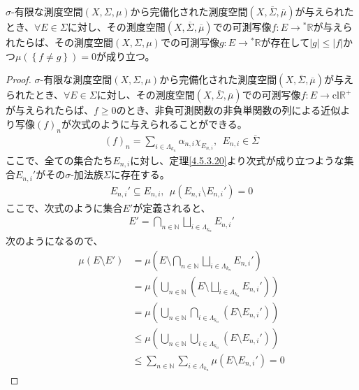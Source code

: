 \documentclass[dvipdfmx]{jsarticle}
\begin{document}
\begin{thm}\label{4.5.5.22}
$\sigma$-有限な測度空間$(X,\varSigma,\mu)$から完備化された測度空間$\left( X,\overline{\varSigma},\overline{\mu} \right)$が与えられたとき、$\forall E \in \varSigma$に対し、その測度空間$\left( X,\overline{\varSigma},\overline{\mu} \right)$での可測写像$f:E \rightarrow{}^{*}\mathbb{R}$が与えられたらば、その測度空間$(X,\varSigma,\mu)$での可測写像$g:E \rightarrow{}^{*}\mathbb{R}$が存在して$|g| \leq |f|$かつ$\mu\left( \left\{ f \neq g \right\} \right) = 0$が成り立つ。
\end{thm}
\begin{proof}
$\sigma$-有限な測度空間$(X,\varSigma,\mu)$から完備化された測度空間$\left( X,\overline{\varSigma},\overline{\mu} \right)$が与えられたとき、$\forall E \in \varSigma$に対し、その測度空間$\left( X,\overline{\varSigma},\overline{\mu} \right)$での可測写像$f:E \rightarrow \mathrm{cl}\mathbb{R}^{+}$が与えられたらば、$f \geq 0$のとき、非負可測関数の非負単関数の列による近似より写像$(f)_{n}$が次式のように与えられることができる。
\begin{align*}
(f)_{n} = \sum_{i \in \varLambda_{k_{n}}} {\alpha_{n,i}\chi_{E_{n,i}}},\ \ E_{n,i} \in \overline{\varSigma}
\end{align*}
ここで、全ての集合たち$E_{n,i}$に対し、定理\ref{4.5.3.20}より次式が成り立つような集合$E_{n,i}'$がその$\sigma$-加法族$\varSigma$に存在する。
\begin{align*}
E_{n,i}' \subseteq E_{n,i},\ \ \mu\left( E_{n,i} \setminus E_{n,i}' \right) = 0
\end{align*}
ここで、次式のように集合$E'$が定義されると、
\begin{align*}
E' = \bigcap_{n \in \mathbb{N}} {\bigsqcup_{i \in \varLambda_{k_{n}}} E_{n,i}'}
\end{align*}
次のようになるので、
\begin{align*}
\mu\left( E \setminus E' \right) &= \mu\left( E \setminus \bigcap_{n \in \mathbb{N}} {\bigsqcup_{i \in \varLambda_{k_{n}}} E_{n,i}'} \right)\\
&= \mu\left( \bigcup_{n \in \mathbb{N}} \left( E \setminus \bigsqcup_{i \in \varLambda_{k_{n}}} E_{n,i}' \right) \right)\\
&= \mu\left( \bigcup_{n \in \mathbb{N}} {\bigcap_{i \in \varLambda_{k_{n}}} \left( E \setminus E_{n,i}' \right)} \right)\\
&\leq \mu\left( \bigcup_{n \in \mathbb{N}} {\bigcup_{i \in \varLambda_{k_{n}}} \left( E \setminus E_{n,i}' \right)} \right)\\
&\leq \sum_{n \in \mathbb{N}} {\sum_{i \in \varLambda_{k_{n}}} {\mu\left( E \setminus E_{n,i}' \right)}} = 0

\end{align*}
\end{proof}
\end{document}
